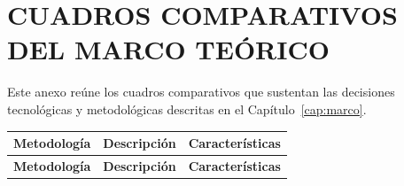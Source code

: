 \chapter{CUADROS COMPARATIVOS DEL MARCO TEÓRICO}
\label{anx:comparativas}

Este anexo reúne los cuadros comparativos que sustentan las decisiones
tecnológicas y metodológicas descritas en el Capítulo~\ref{cap:marco}.

{\small
\begin{longtable}{|L{2.6cm}|L{6.65cm}|L{5.4cm}|}
\hline
{} \textbf{Metodología} & \textbf{Descripción} & \textbf{Características} \\
\hline
\endfirsthead
\hline
{} \textbf{Metodología} & \textbf{Descripción} & \textbf{Características} \\
\hline
\endhead


\end{longtable}}
